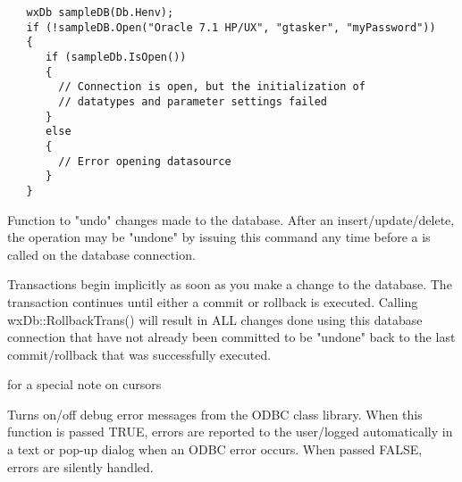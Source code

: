 

\begin{verbatim}
   wxDb sampleDB(Db.Henv);
   if (!sampleDB.Open("Oracle 7.1 HP/UX", "gtasker", "myPassword"))
   {
      if (sampleDb.IsOpen())
      {
        // Connection is open, but the initialization of 
        // datatypes and parameter settings failed
      }
      else
      {
        // Error opening datasource
      }
   }
\end{verbatim}


\label{wxdbrollbacktrans}


Function to "undo" changes made to the database.  After an insert/update/delete, the operation may be "undone" by issuing this command any time before a  is called on the database connection.


Transactions begin implicitly as soon as you make a change to the database.  The 
transaction continues until either a commit or rollback is executed.  Calling 
wxDb::RollbackTrans() will result in ALL changes done using this database 
connection that have not already been committed to be "undone" back to the last 
commit/rollback that was successfully executed.



 for a special note on cursors


\label{wxdbsetdebugerrormessages}




Turns on/off debug error messages from the ODBC class library.  When
this function is passed TRUE, errors are reported to the user/logged automatically
in a text or pop-up dialog when an ODBC error occurs.  When passed FALSE,
errors are silently handled.

